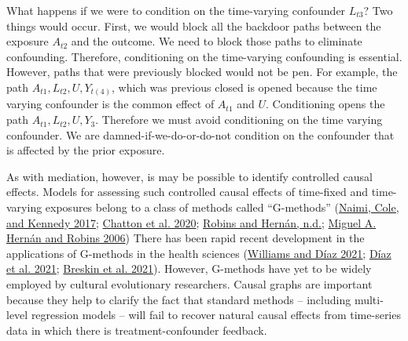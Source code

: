 \documentclass[
  singlecolumn]{report}
\begin{document}
What happens if we were to condition on the time-varying confounder
\(L_{t3}\)? Two things would occur. First, we would block all the
backdoor paths between the exposure \(A_{t2}\) and the outcome. We need
to block those paths to eliminate confounding. Therefore, conditioning
on the time-varying confounding is essential. However, paths that were
previously blocked would not be pen. For example, the path
\(A_{t1}, L_{t2}, U, Y_{t(4)}\), which was previous closed is opened
because the time varying confounder is the common effect of \(A_{t1}\)
and \(U\). Conditioning opens the path \(A_{t1}, L_{t2}, U, Y_{3}\).
Therefore we must avoid conditioning on the time varying confounder. We
are damned-if-we-do-or-do-not condition on the confounder that is
affected by the prior exposure.

As with mediation, however, is may be possible to identify controlled
causal effects. Models for assessing such controlled causal effects of
time-fixed and time-varying exposures belong to a class of methods
called ``G-methods'' (\protect\hyperlink{ref-naimi2017}{Naimi, Cole, and
Kennedy 2017}; \protect\hyperlink{ref-chatton2020}{Chatton et al. 2020};
\protect\hyperlink{ref-robins}{Robins and Hernán, n.d.};
\protect\hyperlink{ref-hernuxe1n2006}{Miguel A. Hernán and Robins 2006})
There has been rapid recent development in the applications of G-methods
in the health sciences (\protect\hyperlink{ref-williams2021}{Williams
and Díaz 2021}; \protect\hyperlink{ref-duxedaz2021}{Díaz et al. 2021};
\protect\hyperlink{ref-breskin2021}{Breskin et al. 2021}). However,
G-methods have yet to be widely employed by cultural evolutionary
researchers. Causal graphs are important because they help to clarify
the fact that standard methods -- including multi-level regression
models -- will fail to recover natural causal effects from time-series
data in which there is treatment-confounder feedback.
\end{document}
